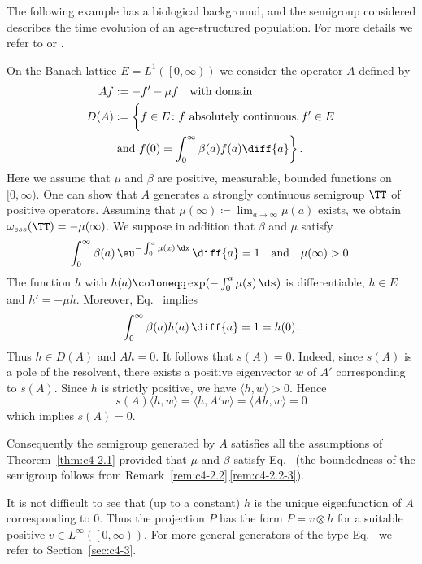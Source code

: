 The following example has a biological background, and the semigroup considered describes the time evolution of an age-structured population.
For more details we refer to \textcite{greiner:1984a} or \textcite{webb:1984}.
\begin{example}\label{ex:c4-2.3}
On the Banach lattice $E = L^{1}( \left[0,\infty\right))$ we consider the operator $A$ defined by
\begin{equation}\label{eq:c4-2.2}
\begin{split}
	Af &:= -f' - \mu f \quad \text{with domain}\\ 
	D(A) &:= \left\{ \vphantom{\int_{0}^{\infty}}f \in E \colon f \text{ absolutely continuous}, f' \in E  \right. \\
	 \qquad & \left. \text{and } f(0) = \int_{0}^{\infty} \beta(a) f(a)  \diff{a} \vphantom{\}} \right\}.
\end{split}
\end{equation}
Here we assume that $\mu$ and $\beta$ are positive, measurable, bounded functions on $[0,\infty)$.
One can show that $A$ generates a strongly continuous semigroup $\TT$ of positive operators.
Assuming that $\mu(\infty) \coloneqq \lim_{a \to \infty}\mu(a)$ exists, we obtain $\omega_{ess}(\TT) = -\mu(\infty)$.
We suppose in addition that $\beta$ and $\mu$ satisfy
\begin{equation}\label{eq:c4-2.3}
\int_{0}^{\infty} \beta(a)\,\eu^{-\int_{0}^{a} \mu(x)\,\dx}\,\diff{a} = 1
\quad \text{and} \quad \mu(\infty) > 0.
\end{equation}
The function $h$ with $h(a) \coloneqq \exp(-\int_{0}^{a} \mu(s) \, \ds)$ is differentiable, $h \in E$ and $h' = -\mu h$.
Moreover, Eq.~ implies 
%
\[
	 \int_{0}^{\infty} \beta(a)h(a) \, \diff{a} = 1 = h(0) .
\]
%
Thus $h \in D(A)$ and $Ah = 0$.
It follows that $s(A) = 0$.
Indeed, since $s(A)$ is a pole of the resolvent, there exists a positive eigenvector $w$ of\/ $A'$ corresponding to $s(A)$.
Since $h$ is strictly positive, we have $\langle h,w \rangle > 0$. 
Hence 
\[
s(A)\langle h,w \rangle = \langle h,A'w \rangle = \langle Ah,w \rangle = 0
\]
which implies $s(A) = 0$.

Consequently the semigroup generated by $A$ satisfies all the assumptions of Theorem~\ref{thm:c4-2.1} provided that $\mu$ and $\beta$ satisfy Eq.~ (the boundedness of the semigroup follows from Remark~\ref{rem:c4-2.2}\,\ref{rem:c4-2.2-3}).

It is not difficult to see that (up to a constant) $h$ is the unique eigenfunction of\/ $A$ corresponding to $0$.
Thus the projection $P$ has the form $P = v \otimes h$ for a suitable positive $v \in L^{\infty}(\left[0,\infty\right))$.
For more general generators of the type Eq.~ we refer to Section~\ref{sec:c4-3}.
\end{example}
